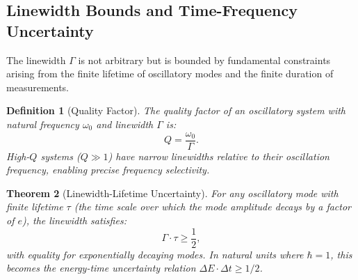 \documentclass[twocolumn,10pt,a4paper]{article}
\newtheorem{theorem}{Theorem}[section]
\newtheorem{definition}[theorem]{Definition}
\theoremstyle{remark}
\begin{document}
\subsection{Linewidth Bounds and Time-Frequency Uncertainty}

The linewidth $\Gamma$ is not arbitrary but is bounded by fundamental constraints arising from the finite lifetime of oscillatory modes and the finite duration of measurements.

\begin{definition}[Quality Factor]
\label{def:quality_factor}
The \emph{quality factor} of an oscillatory system with natural frequency $\omega_0$ and linewidth $\Gamma$ is:
\begin{equation}
Q = \frac{\omega_0}{\Gamma}.
\end{equation}
High-$Q$ systems ($Q \gg 1$) have narrow linewidths relative to their oscillation frequency, enabling precise frequency selectivity.
\end{definition}

\begin{theorem}[Linewidth-Lifetime Uncertainty]
\label{thm:linewidth_lifetime}
For any oscillatory mode with finite lifetime $\tau$ (the time scale over which the mode amplitude decays by a factor of $e$), the linewidth satisfies:
\begin{equation}
\Gamma \cdot \tau \geq \frac{1}{2},
\end{equation}
with equality for exponentially decaying modes. In natural units where $\hbar = 1$, this becomes the energy-time uncertainty relation $\Delta E \cdot \Delta t \geq 1/2$.
\end{theorem}
\end{document}
